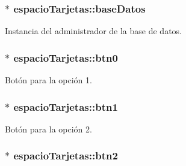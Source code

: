 \subsubsection[{base\+Datos}]{$\ast$ espacio\+Tarjetas\+::base\+Datos\hspace{0.3cm}{\ttfamily [private]}}\label{classespacio_tarjetas_ae26629329afda23bc6252054dcad92d3}


Instancia del administrador de la base de datos. 

\hypertarget{classespacio_tarjetas_a1b66f906dbd856b501412a42c50da0af}{}
\subsubsection[{btn0}]{$\ast$ espacio\+Tarjetas\+::btn0\hspace{0.3cm}{\ttfamily [private]}}\label{classespacio_tarjetas_a1b66f906dbd856b501412a42c50da0af}


Botón para la opción 1. 

\hypertarget{classespacio_tarjetas_a6f9729b868bcfef80cd3c71e22950425}{}
\subsubsection[{btn1}]{$\ast$ espacio\+Tarjetas\+::btn1\hspace{0.3cm}{\ttfamily [private]}}\label{classespacio_tarjetas_a6f9729b868bcfef80cd3c71e22950425}


Botón para la opción 2. 

\hypertarget{classespacio_tarjetas_ab0d28914026c02d7bd073d79e9c2f84e}{}
\subsubsection[{btn2}]{$\ast$ espacio\+Tarjetas\+::btn2\hspace{0.3cm}{\ttfamily [private]}}\label{classespacio_tarjetas_ab0d28914026c02d7bd073d79e9c2f84e}



